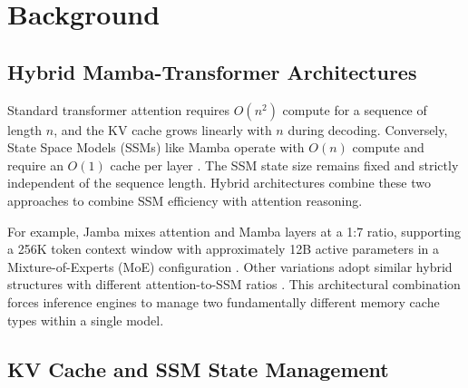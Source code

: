 \section{Background}
\label{sec:background}


\subsection{Hybrid Mamba-Transformer Architectures}
\label{sec:background:hybrid}

Standard transformer attention requires $O(n^2)$ compute for a sequence of length $n$, and the KV cache grows linearly with $n$ during decoding. Conversely, State Space Models (SSMs) like Mamba operate with $O(n)$ compute and require an $O(1)$ cache per layer \cite{gu2023mamba, dao2024mamba2}. The SSM state size remains fixed and strictly independent of the sequence length. Hybrid architectures combine these two approaches to combine SSM efficiency with attention reasoning.

For example, Jamba mixes attention and Mamba layers at a 1:7 ratio, supporting a 256K token context window with approximately 12B active parameters in a Mixture-of-Experts (MoE) configuration \cite{lieber2024jamba}. Other variations adopt similar hybrid structures with different attention-to-SSM ratios \cite{glorioso2024zamba2, ren2024samba, dong2024hymba, botev2024recurrentgemma}. This architectural combination forces inference engines to manage two fundamentally different memory cache types within a single model.

\subsection{KV Cache and SSM State Management}
\label{sec:background:cache}

